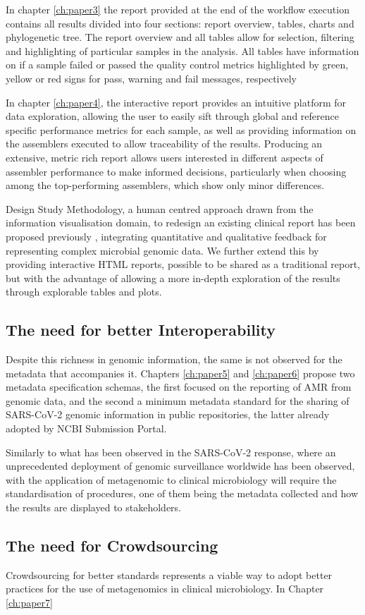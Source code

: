 In chapter \ref{ch:paper3} the report provided at the end of the workflow execution contains all results divided into four sections: report overview, tables, charts and phylogenetic tree. The report overview and all tables allow for selection, filtering and highlighting of particular samples in the analysis. All tables have information on if a sample failed or passed the quality control metrics highlighted by green, yellow or red signs for pass, warning and fail messages, respectively

In chapter \ref{ch:paper4}, the interactive report provides an intuitive platform for data exploration, allowing the user to easily sift through global and reference specific performance metrics for each sample, as well as providing information on the assemblers executed to allow traceability of the results. Producing an extensive, metric rich report allows users interested in different aspects of assembler performance to make informed decisions, particularly when choosing among the top-performing assemblers, which show only minor differences.

Design Study Methodology, a human centred approach drawn from the information visualisation domain, to redesign an existing clinical report has been proposed previously \citep{crisan_evidence-based_2018}, integrating quantitative and qualitative feedback for representing complex microbial genomic data. We further extend this by providing interactive HTML reports, possible to be shared as a traditional report, but with the advantage of allowing a more in-depth exploration of the results through explorable tables and plots. 

\subsection{The need for better Interoperability}

Despite this richness in genomic information, the same is not observed for the metadata that accompanies it. Chapters \ref{ch:paper5} and \ref{ch:paper6} propose two metadata specification schemas, the first focused on the reporting of \ac{AMR} from genomic data, and the second a minimum metadata standard for the sharing of \ac{SARS-CoV-2} genomic information in public repositories, the latter already adopted by NCBI Submission Portal. 

Similarly to what has been observed in the \ac{SARS-CoV-2} response, where an unprecedented deployment of genomic surveillance worldwide has been observed, with the application of metagenomic to clinical microbiology will require the standardisation of procedures, one of them being the metadata collected and how the results are displayed to stakeholders. 


\subsection{The need for Crowdsourcing}

Crowdsourcing for better standards represents a viable way to adopt better practices for the use of metagenomics in clinical microbiology. In Chapter \ref{ch:paper7}